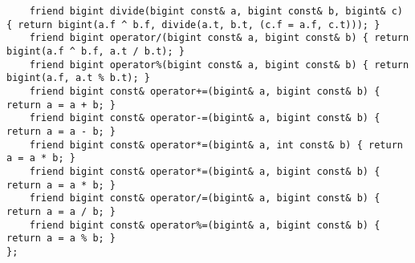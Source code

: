 \begin{verbatim}
    friend bigint divide(bigint const& a, bigint const& b, bigint& c) { return bigint(a.f ^ b.f, divide(a.t, b.t, (c.f = a.f, c.t))); }
    friend bigint operator/(bigint const& a, bigint const& b) { return bigint(a.f ^ b.f, a.t / b.t); }
    friend bigint operator%(bigint const& a, bigint const& b) { return bigint(a.f, a.t % b.t); }
    friend bigint const& operator+=(bigint& a, bigint const& b) { return a = a + b; }
    friend bigint const& operator-=(bigint& a, bigint const& b) { return a = a - b; }
    friend bigint const& operator*=(bigint& a, int const& b) { return a = a * b; }
    friend bigint const& operator*=(bigint& a, bigint const& b) { return a = a * b; }
    friend bigint const& operator/=(bigint& a, bigint const& b) { return a = a / b; }
    friend bigint const& operator%=(bigint& a, bigint const& b) { return a = a % b; }
};
\end{verbatim}